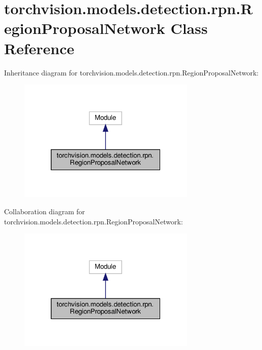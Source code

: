 \hypertarget{classtorchvision_1_1models_1_1detection_1_1rpn_1_1RegionProposalNetwork}{}\section{torchvision.\+models.\+detection.\+rpn.\+Region\+Proposal\+Network Class Reference}
\label{classtorchvision_1_1models_1_1detection_1_1rpn_1_1RegionProposalNetwork}


Inheritance diagram for torchvision.\+models.\+detection.\+rpn.\+Region\+Proposal\+Network\+:
\nopagebreak
\begin{figure}[H]
\begin{center}
\leavevmode
\includegraphics[width=241pt]{classtorchvision_1_1models_1_1detection_1_1rpn_1_1RegionProposalNetwork__inherit__graph}
\end{center}
\end{figure}


Collaboration diagram for torchvision.\+models.\+detection.\+rpn.\+Region\+Proposal\+Network\+:
\nopagebreak
\begin{figure}[H]
\begin{center}
\leavevmode
\includegraphics[width=241pt]{classtorchvision_1_1models_1_1detection_1_1rpn_1_1RegionProposalNetwork__coll__graph}
\end{center}
\end{figure}
